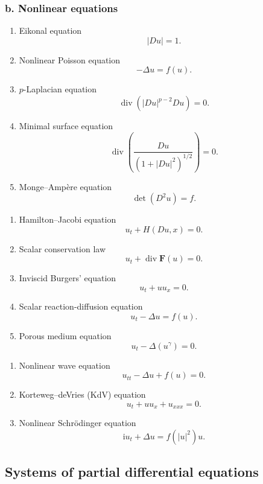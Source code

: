 \subsubsection*{b. Nonlinear equations}
\begin{enumerate}
\item Eikonal equation
\[ |Du|=1. \]
\item Nonlinear Poisson equation
\[ -\Delta u=f(u). \]
\item $p$-Laplacian equation
\[ \operatorname{div}(|Du|^{p-2}Du)=0. \]
\item Minimal surface equation
\[ \operatorname{div}\left(\frac{Du}{(1+|Du|^2)^{1/2}}\right)=0. \]
\item Monge--Ampère equation
\[ \det(D^2u)=f. \]
\end{enumerate}
\par\Needspace{65mm}
\begin{enumerate}[resume]
\item Hamilton--Jacobi equation
\[ u_t+H(Du,x)=0. \]
\item Scalar conservation law
\[ u_t+\operatorname{div}\mathbf F(u)=0. \]
\item Inviscid Burgers' equation
\[ u_t+uu_x=0. \]
\item Scalar reaction-diffusion equation
\[ u_t-\Delta u=f(u). \]
\item Porous medium equation
\[ u_t-\Delta(u^\gamma)=0. \]
\end{enumerate}
\par\Needspace{65mm}
\begin{enumerate}[resume]
\item Nonlinear wave equation
\[ u_{tt}-\Delta u+f(u)=0. \]
\item Korteweg--deVries (KdV) equation
\[ u_t+uu_x+u_{xxx}=0. \]
\item Nonlinear Schrödinger equation
\[ \mathrm i u_t+\Delta u=f(|u|^2)u. \]
\end{enumerate}

\subsection{Systems of partial differential equations}
